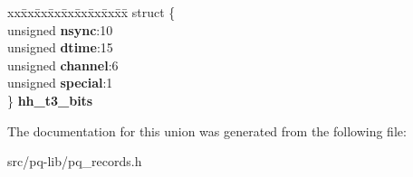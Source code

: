 \begin{DoxyCompactItemize}
\begin{tabbing}
\end{tabbing}\item 
\hypertarget{unionpq__rec__t_a62d4f60e927e7679c4454f40c02c5811}{}\begin{tabbing}
xx\=xx\=xx\=xx\=xx\=xx\=xx\=xx\=xx\=\kill
struct \{\\
\>unsigned {\bfseries nsync}:10\\
\>unsigned {\bfseries dtime}:15\\
\>unsigned {\bfseries channel}:6\\
\>unsigned {\bfseries special}:1\\
\} {\bfseries hh\_t3\_bits}\label{unionpq__rec__t_a62d4f60e927e7679c4454f40c02c5811}
\\

\end{tabbing}\end{DoxyCompactItemize}


The documentation for this union was generated from the following file\+:\begin{DoxyCompactItemize}
\item 
src/pq-\/lib/pq\+\_\+records.\+h\end{DoxyCompactItemize}
